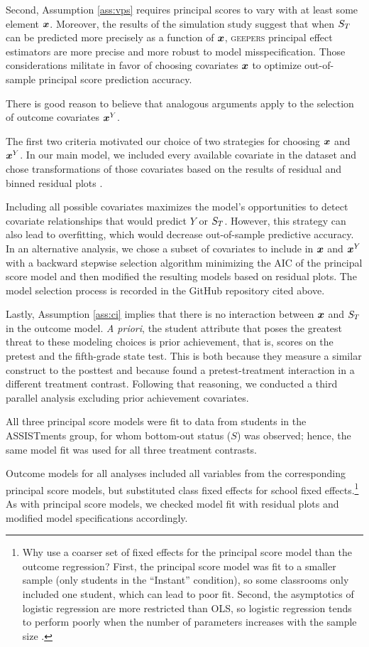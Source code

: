 \documentclass[]{article}
\begin{document}
Second, Assumption \ref{ass:vps} requires principal scores to vary with at least some element $\bm{x}$. Moreover, the results of the simulation study suggest that when $S_T$ can be predicted more precisely as a function of $\bm{x}$, \textsc{geepers} principal effect estimators are more precise and more robust to model misspecification.
Those considerations militate in favor of choosing covariates $\bm{x}$ to optimize out-of-sample principal score prediction accuracy.

There is good reason to believe that analogous arguments apply to the selection of outcome covariates $\bm{x}^Y$.

The first two criteria motivated our choice of two strategies for choosing $\bm{x}$ and $\bm{x}^Y$.
In our main model, we included every available covariate in the dataset and chose transformations of those covariates based on the results of residual and binned residual plots \citep{arm}.

Including all possible covariates maximizes the model's opportunities to detect covariate relationships that would predict $Y$ or $S_T$.
However, this strategy can also lead to overfitting, which would decrease out-of-sample predictive accuracy.
In an alternative analysis, we chose a subset of covariates to include in $\bm{x}$ and $\bm{x}^Y$ with a backward stepwise selection algorithm minimizing the AIC \citep{aic} of the principal score model and then modified the resulting models based on residual plots.
The model selection process is recorded in the GitHub repository cited above.

Lastly, Assumption \ref{ass:ci} implies that there is no interaction between $\bm{x}$ and $S_T$ in the outcome model. 
\emph{A priori}, the student attribute that poses the greatest threat to these modeling choices is prior achievement, that is, scores on the pretest and the fifth-grade state test.
This is both because they measure a similar construct to the posttest and because \cite{impactPaper} found a pretest-treatment interaction in a different treatment contrast.
Following that reasoning, we conducted a third parallel analysis excluding prior achievement covariates. %

All three principal score models were fit to data from students in the ASSISTments group, for whom bottom-out status ($S$) was observed; hence, the same model fit was used for all three treatment contrasts.

Outcome models for all analyses included all variables from the corresponding principal score models, but substituted class fixed effects for school fixed effects.\footnote{Why use a coarser set of fixed effects for the principal score model than the outcome regression? First, the principal score model was fit to a smaller sample (only students in the ``Instant'' condition), so some classrooms only included one student, which can lead to poor fit. Second, the asymptotics of logistic regression are more restricted than OLS, so logistic regression tends to perform poorly when the number of parameters increases with the sample size \citep{agresti}.}
As with principal score models, we checked model fit with residual plots and modified model specifications accordingly.
\end{document}
